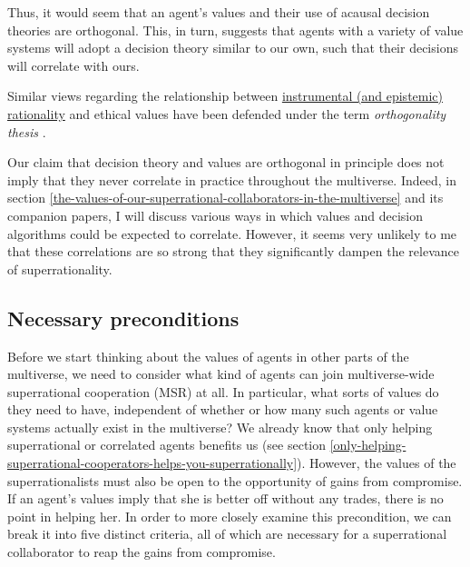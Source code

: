 Thus, it would seem that an agent's values and their use of acausal
decision theories are orthogonal. This, in turn, suggests that agents
with a variety of value systems will adopt a decision theory similar to
our own, such that their decisions will correlate with ours.

Similar views regarding the relationship between
\href{http://lesswrong.com/lw/31/what_do_we_mean_by_rationality/}{instrumental
(and epistemic) rationality} and ethical values have been defended
under the term \emph{orthogonality thesis}
\parencites[][ch. 7, section ``The relation between intelligence and motivation'']{Bostrom2014-pc}{Bostrom2012-hj}{Armstrong2013-xo}.

Our claim that decision theory and values are orthogonal in principle
does not imply that they never correlate in practice throughout the
multiverse. Indeed, in section
\ref{the-values-of-our-superrational-collaborators-in-the-multiverse} and its
companion papers, I will discuss various ways in which values and
decision algorithms could be expected to correlate. However, it seems
very unlikely to me that these correlations are so strong that they
significantly dampen the relevance of superrationality.

\hypertarget{necessary-preconditions}{\subsection{Necessary
preconditions}\label{necessary-preconditions}}

Before we start thinking about the values of agents in other parts of
the multiverse, we need to consider what kind of agents can join
multiverse-wide superrational cooperation (MSR) at all. In particular,
what sorts of values do they need to have, independent of whether or how
many such agents or value systems actually exist in the multiverse? We
already know that only helping superrational or correlated agents
benefits us (see section
\ref{only-helping-superrational-cooperators-helps-you-superrationally}).
However, the values of the superrationalists must also be open to the
opportunity of gains from compromise. If an agent's values imply that
she is better off without any trades, there is no point in helping her.
In order to more closely examine this precondition, we can break it into
five distinct criteria, all of which are necessary for a superrational
collaborator to reap the gains from compromise.

